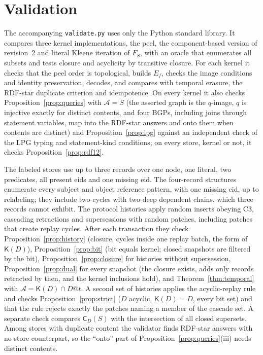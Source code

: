 \documentclass[11pt]{article}
\theoremstyle{plain}
\theoremstyle{definition}
\theoremstyle{remark}
\newcommand{\Kernel}{\mathsf{K}}
\newcommand{\Close}{\mathsf{C}}
\begin{document}
\section{Validation}\label{sec:validation}
The accompanying \texttt{validate.py} uses only the Python standard library. It
compares three kernel implementations, the peel, the component-based version of
revision~2 and literal Kleene iteration of $F_S$, with an oracle that enumerates all
subsets and tests closure and acyclicity by transitive closure. For each kernel it
checks that the peel order is topological, builds $E_f$, checks the image
conditions and identity preservation, decodes, and compares with temporal erasure,
the RDF-star duplicate criterion and idempotence. On every kernel it also checks
Proposition~\ref{prop:queries} with $\mathcal A=S$ (the asserted graph is the
$q$-image, $q$ is injective exactly for distinct contents, and four BGPs, including
joins through statement variables, map into the RDF-star answers and onto them when
contents are distinct) and Proposition~\ref{prop:lpg} against an independent check of
the LPG typing and statement-kind conditions; on every store, kernel or not, it
checks Proposition~\ref{prop:rdf12}.


The labeled stores use up to three records over one node, one literal, two
predicates, all present eids and one missing eid. The four-record structures
enumerate every subject and object reference pattern, with one missing eid, up to
relabeling; they include two-cycles with two-deep dependent chains, which three
records cannot exhibit. The protocol histories apply random inserts obeying C3,
cascading retractions and supersessions with random patches, including patches that
create replay cycles. After each transaction they check
Proposition~\ref{prop:history} (closure, cycles inside one replay batch, the form of
$\Kernel(D)$), Proposition~\ref{prop:bit} (bit equals kernel; closed snapshots are
filtered by the bit), Proposition~\ref{prop:closure} for histories without
supersession, Proposition~\ref{prop:dual} for every snapshot (the closure exists,
adds only records retracted by then, and the kernel inclusions hold), and
Theorem~\ref{thm:temporal} with $\mathcal A=\Kernel(D)\cap D@t$. A second set of
histories applies the acyclic-replay rule and checks Proposition~\ref{prop:strict}
($D$ acyclic, $\Kernel(D)=D$, every bit set) and that the rule rejects exactly the
patches naming a member of the cascade set. A separate check compares $\Close_D(S)$
with the intersection of all closed supersets. Among stores with duplicate content
the validator finds RDF-star answers with no store counterpart, so the ``onto'' part
of Proposition~\ref{prop:queries}(iii) needs distinct contents.
\end{document}
